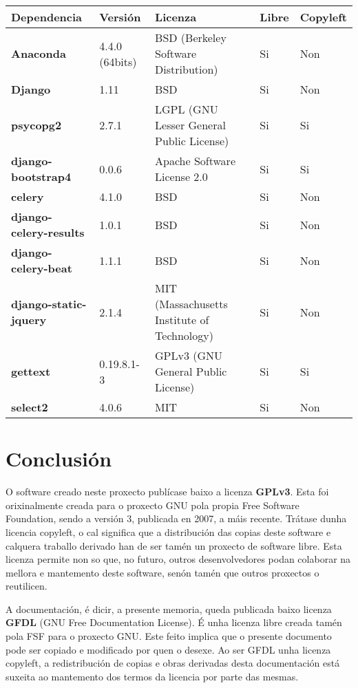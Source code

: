 \begin{longtable}{|p{3cm}|p{1.5cm}|p{5.5cm}|p{1cm}|p{1.5cm}|}
	\hline
	\rowcolor{gray!50}
	Dependencia & Versión & Licenza & Libre & Copyleft \\
	\hline
	\textbf{Anaconda} & 4.4.0 (64bits) & BSD (Berkeley Software Distribution) & Si & Non \\
	\hline
	\textbf{Django} & 1.11 & BSD & Si & Non \\
	\hline
	\textbf{psycopg2} & 2.7.1 & LGPL (GNU Lesser General Public License) & Si & Si \\	
	\hline
	\textbf{django-bootstrap4} & 0.0.6 & Apache Software License 2.0 & Si & Si\\
	\hline
	\textbf{celery} & 4.1.0 & BSD & Si & Non \\
	\hline
	\textbf{django-celery-results} & 1.0.1 & BSD & Si & Non \\
	\hline
	\textbf{django-celery-beat} & 1.1.1 & BSD & Si & Non \\
	\hline
	\textbf{django-static-jquery} & 2.1.4 & MIT (Massachusetts Institute of Technology) & Si & Non \\
	\hline
	\textbf{gettext} & 0.19.8.1-3 & GPLv3 (GNU General Public License) & Si & Si \\
	\hline
	\textbf{select2} & 4.0.6 & MIT & Si & Non \\
	\hline
\end{longtable}


\section{Conclusión}

O software creado neste proxecto publícase baixo a licenza \textbf{GPLv3}. Esta foi orixinalmente creada para o proxecto GNU pola propia Free Software Foundation, sendo a versión 3, publicada en 2007, a máis recente. Trátase dunha licencia copyleft, o cal significa que a distribución das copias deste software e calquera traballo derivado han de ser tamén un proxecto de software libre. Esta licenza permite non so que, no futuro, outros desenvolvedores podan colaborar na mellora e mantemento deste software, senón tamén que outros proxectos o reutilicen.

A documentación, é dicir, a presente memoria, queda publicada baixo licenza \textbf{GFDL} (GNU Free Documentation License). É unha licenza libre creada tamén pola FSF para o proxecto GNU. Este feito implica que o presente documento pode ser copiado e modificado por quen o desexe. Ao ser GFDL unha licenza copyleft, a redistribución de copias e obras derivadas desta documentación está suxeita ao mantemento dos termos da licencia por parte das mesmas.

